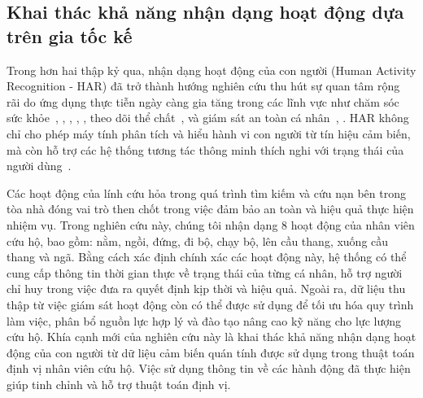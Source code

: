 \label{method_har}

\subsection{Khai thác khả năng nhận dạng hoạt động dựa trên gia tốc kế}

Trong hơn hai thập kỷ qua, nhận dạng hoạt động của con người (Human Activity Recognition - HAR) đã trở thành hướng nghiên cứu thu hút sự quan tâm rộng rãi do ứng dụng thực tiễn ngày càng gia tăng trong các lĩnh vực như chăm sóc sức khỏe~\cite{vi2024efficient}, \cite{bui2024smart}, \cite{hong2023low}, \cite{dao2022human}, \cite{thu2022real}, theo dõi thể chất~\cite{vu2024sports}, và giám sát an toàn cá nhân~\cite{dao2025rfar}, \cite{bui2025development}. HAR không chỉ cho phép máy tính phân tích và hiểu hành vi con người từ tín hiệu cảm biến, mà còn hỗ trợ các hệ thống tương tác thông minh thích nghi với trạng thái của người dùng~\cite{vi2024efficient}.

Các hoạt động của lính cứu hỏa trong quá trình tìm kiếm và cứu nạn bên trong tòa nhà đóng vai trò then chốt trong việc đảm bảo an toàn và hiệu quả thực hiện nhiệm vụ. Trong nghiên cứu này, chúng tôi nhận dạng 8 hoạt động của nhân viên cứu hộ, bao gồm: nằm, ngồi, đứng, đi bộ, chạy bộ, lên cầu thang, xuống cầu thang và ngã. Bằng cách xác định chính xác các hoạt động này, hệ thống có thể cung cấp thông tin thời gian thực về trạng thái của từng cá nhân, hỗ trợ người chỉ huy trong việc đưa ra quyết định kịp thời và hiệu quả. Ngoài ra, dữ liệu thu thập từ việc giám sát hoạt động còn có thể được sử dụng để tối ưu hóa quy trình làm việc, phân bổ nguồn lực hợp lý và đào tạo nâng cao kỹ năng cho lực lượng cứu hộ. Khía cạnh mới của nghiên cứu này là khai thác khả năng nhận dạng hoạt động của con người từ dữ liệu cảm biến quán tính được sử dụng trong thuật toán định vị nhân viên cứu hộ. Việc sử dụng thông tin về các hành động đã thực hiện giúp tinh chỉnh và hỗ trợ thuật toán định vị.


